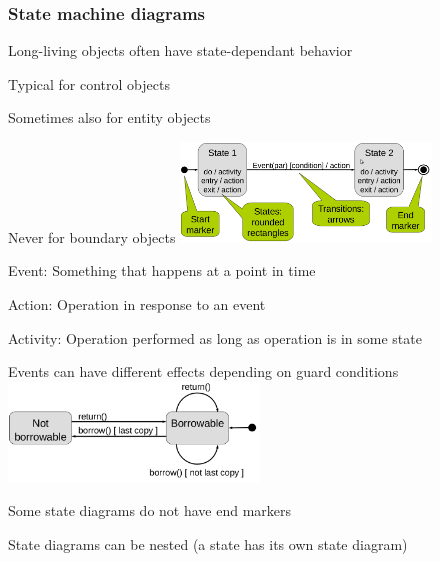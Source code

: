 \subsubsection{State machine diagrams}
\enumstart
	\item Long-living objects often have state-dependant behavior
	\enumstart
		\item Typical for control objects
		\item Sometimes also for entity objects
		\item Never for boundary objects
	\enumend
	\includegraphics[width=0.5\textwidth]{img/state_diagram.png}
	\item Event: Something that happens at a point in time
	\item Action: Operation in response to an event
	\item Activity: Operation performed as long as operation is in some state
	\item Events can have different effects depending on guard conditions
	\\ \includegraphics[width=0.5\textwidth]{img/guard_condition.png}
	\item Some state diagrams do not have end markers
	\item State diagrams can be nested (a state has its own state diagram)
\enumend

